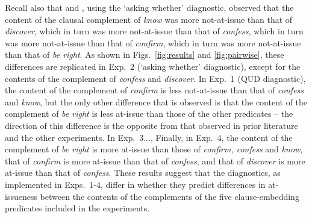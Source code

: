 \documentclass[times,linguex,xcolor]{glossa}
\begin{document}
  Recall also that \citealt{tonhauser_how_2018} and \citealt{degen-tonhauser-glossa}, using the `asking whether' diagnostic, observed that the content of the clausal complement of \emph{know} was more not-at-issue than that of \emph{discover}, which in turn was more not-at-issue than that of \emph{confess}, which in turn was more not-at-issue than that of \emph{confirm}, which in turn was more not-at-issue than that of \emph{be right}.  As shown in Figs.~\ref{fig:results} and \ref{fig:pairwise}, these differences are replicated in Exp.~2 (`asking whether' diagnostic), except for the contents of the complement of \emph{confess} and \emph{discover}. In Exp.~1 (QUD diagnostic), the content of the complement of \emph{confirm} is less not-at-issue than that of \emph{confess} and \emph{know}, but the only other difference that is observed is that the content of the complement of \emph{be right} is less at-issue than those of the other predicates -- the direction of this difference is the opposite from that observed in prior literature and the other experiments. In Exp.~3..., Finally, in Exp.~4, the content of the complement of \emph{be right} is more at-issue than those of \emph{confirm, confess} and \emph{know}, that of \emph{confirm} is more at-issue than that of \emph{confess}, and that of \emph{discover} is more at-issue than that of \emph{confess}. These results suggest that the diagnostics, as implemented in Exps.~1-4, differ in whether they predict differences in at-issueness between the contents of the complements of the five clause-embedding predicates included in the experiments.
   
 
 
  
 
\addtolength{\tabcolsep}{-.19em}
\end{document}
